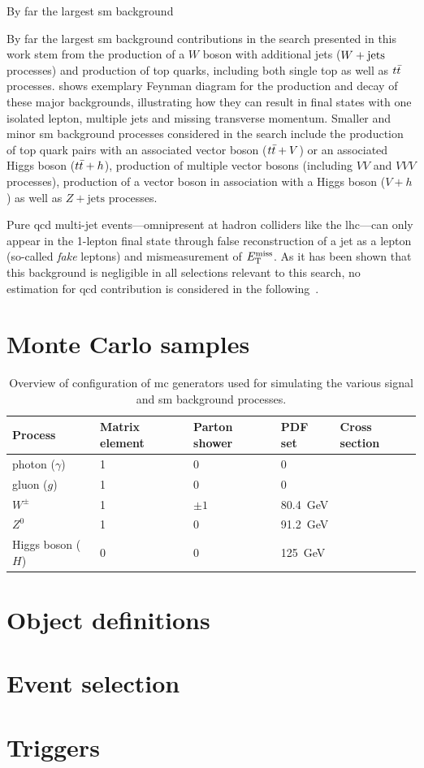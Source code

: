 By far the largest \gls{sm} background

By far the largest \gls{sm} background contributions in the search presented in this work stem from the production of a $W$ boson with additional jets ($W+\mathrm{jets}$ processes) and production of top quarks, including both single top as well as $t\bar{t}$ processes.  shows exemplary Feynman diagram for the production and decay of these major backgrounds, illustrating how they can result in final states with one isolated lepton, multiple jets and missing transverse momentum. Smaller and minor \gls{sm} background processes considered in the search include the production of top quark pairs with an associated vector boson ($t\bar{t} + V$) or an associated Higgs boson ($t\bar{t} + h$), production of multiple vector bosons (including $VV$ and $VVV$ processes), production of a vector boson in association with a Higgs boson ($V+h$) as well as $Z+\mathrm{jets}$ processes.

Pure \gls{qcd} multi-jet events---omnipresent at hadron colliders like the \gls{lhc}---can only appear in the 1-lepton final state through false reconstruction of a jet as a lepton (so-called \textit{fake} leptons) and mismeasurement of $E_{\textrm{T}}^{\textrm{miss}}$. As it has been shown that this background is negligible in all selections relevant to this search, no estimation for \gls{qcd} contribution is considered in the following~\cite{SUSY-2019-08}.

\section{Monte Carlo samples}

\begin{table}
	\centering
	\setlength\heavyrulewidth{0.2ex}
	\small
	\caption{Overview of configuration of \gls{mc} generators used for simulating the various signal and \gls{sm} background processes.}
	\begin{tabular} {lllll}
	\toprule
		Process & Matrix element & Parton shower & PDF set & Cross section \\ 
	\midrule
		photon ($\gamma$) & 1 & 0 & 0\\
		gluon ($g$) & 1 & 0 & 0 \\
		$W^\pm$ & 1 & $\pm 1$ & \SI{80.4}{\GeV} \\
		$Z^0$ & 1 & 0 & \SI{91.2}{\GeV} \\
		Higgs boson ($H$) & 0 & 0 & \SI{125}{\GeV} \\
	\bottomrule					
	\end{tabular}\vspace{3mm}
	\label{tab:particles_bosons}   
\end{table}

\section{Object definitions}

\section{Event selection}

\section{Triggers}